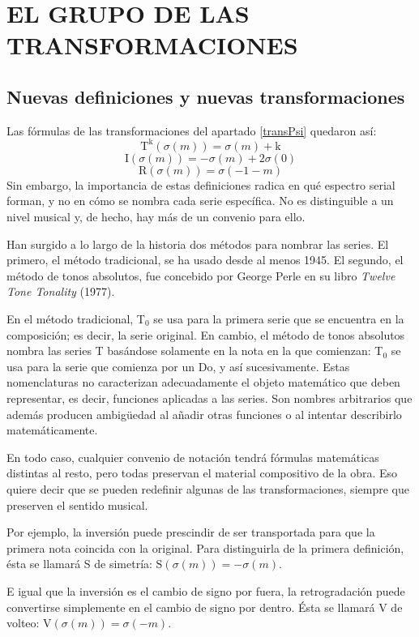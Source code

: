 \chapter{EL GRUPO DE LAS TRANSFORMACIONES}
	\section{Nuevas definiciones y nuevas transformaciones}
		\label{ciclico} 
		Las fórmulas de las transformaciones del apartado \ref{transPsi} quedaron así:
		\[\text{T}^\text{k}(\sigma(m)) = \sigma(m) + \text{k}\]			
		\[\text{I}(\sigma(m)) = -\sigma(m) + 2\sigma(0)\]			
		\[\text{R}(\sigma(m)) = \sigma(-1-m)\]		
		Sin embargo, la importancia de estas definiciones radica en qué espectro serial forman, y no en cómo se nombra cada serie específica. No es distinguible a un nivel musical y, de hecho, hay más de un convenio para ello.
		
		Han surgido a lo largo de la historia dos métodos para nombrar las series. El primero, el método tradicional, se ha usado desde al menos 1945. El segundo, el método de tonos absolutos, fue concebido por George Perle en su libro \emph{Twelve Tone Tonality} (1977).
		
		En el método tradicional, T$_0$ se usa para la primera serie que se encuentra en la composición; es decir, la serie original. En cambio, el método de tonos absolutos nombra las series T basándose solamente en la nota en la que comienzan: T$_0$ se usa para la serie que comienza por un Do, y así sucesivamente. Estas nomenclaturas no caracterizan adecuadamente el objeto matemático que deben representar, es decir, funciones aplicadas a las series. Son nombres arbitrarios que además producen ambigüedad al añadir otras funciones o al intentar describirlo matemáticamente.
		
		En todo caso, cualquier convenio de notación tendrá fórmulas matemáticas distintas al resto, pero todas preservan el material compositivo de la obra. Eso quiere decir que se pueden redefinir algunas de las transformaciones, siempre que preserven el sentido musical. 
		
		Por ejemplo, la inversión puede prescindir de ser transportada para que la primera nota coincida con la original. Para distinguirla de la primera definición, ésta se llamará S de simetría: $\text{S}(\sigma(m)) = -\sigma(m)$.
		
		E igual que la inversión es el cambio de signo por fuera, la retrogradación puede convertirse simplemente en el cambio de signo por dentro. Ésta se llamará V de volteo: $\text{V}(\sigma(m)) = \sigma(-m)$.
		
